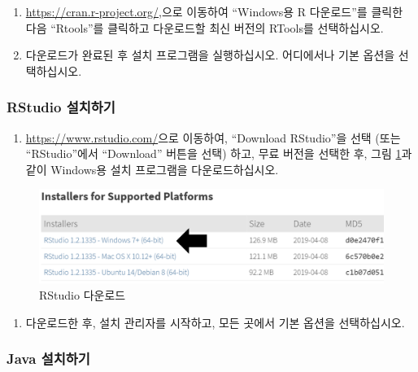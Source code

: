 \documentclass[11pt]{book}
\providecommand{\tightlist}{%
  \setlength{\itemsep}{0pt}\setlength{\parskip}{0pt}}
\theoremstyle{definition}
\theoremstyle{definition}
\theoremstyle{definition}
\theoremstyle{remark}
\begin{document}
\begin{enumerate}
\def\labelenumi{\arabic{enumi}.}
\item
  \url{https://cran.r-project.org/},으로 이동하여 ``Windows용 R
  다운로드''를 클릭한 다음 ``Rtools''를 클릭하고 다운로드할 최신 버전의
  RTools를 선택하십시오.
\item
  다운로드가 완료된 후 설치 프로그램을 실행하십시오. 어디에서나 기본
  옵션을 선택하십시오.
\end{enumerate}

\subsubsection*{RStudio 설치하기}\label{rstudio-}

\begin{enumerate}
\def\labelenumi{\arabic{enumi}.}
\tightlist
\item
  \url{https://www.rstudio.com/}으로 이동하여, ``Download RStudio''을
  선택 (또는 ``RStudio''에서 ``Download'' 버튼을 선택) 하고, 무료 버전을
  선택한 후, 그림 \ref{fig:downloadRStudio}과 같이 Windows용 설치
  프로그램을 다운로드하십시오.
\end{enumerate}

\begin{figure}

{\centering \includegraphics[width=1\linewidth]{images/OhdsiAnalyticsTools/downloadRStudio} 

}

\caption{RStudio 다운로드}\label{fig:downloadRStudio}
\end{figure}

\begin{enumerate}
\def\labelenumi{\arabic{enumi}.}
\setcounter{enumi}{1}
\tightlist
\item
  다운로드한 후, 설치 관리자를 시작하고, 모든 곳에서 기본 옵션을
  선택하십시오.
\end{enumerate}

\subsubsection*{Java 설치하기}\label{java-}
\end{document}
